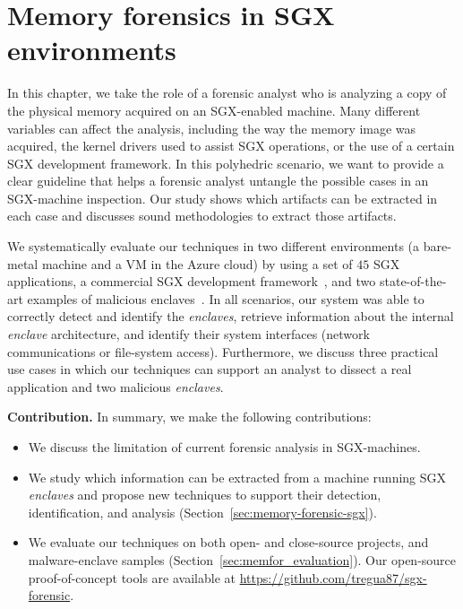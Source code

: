 \chapter{Memory forensics in SGX environments}
\label{chp:forensic}


In this chapter, we take the role of a forensic analyst who is analyzing a copy 
of the physical memory acquired on an SGX-enabled machine. 
Many different variables can affect the analysis, including the way the memory 
image was acquired, the kernel drivers used to assist SGX operations, or the 
use of a certain SGX development framework. In this polyhedric scenario, we 
want to provide a clear guideline that helps a forensic analyst untangle the 
possible cases in an SGX-machine inspection. Our study shows which artifacts 
can be extracted in each case and discusses sound methodologies to extract those
artifacts.

We systematically evaluate our techniques in two different environments (a 
bare-metal machine and a VM in the Azure cloud) by using a set of $45$ SGX 
applications, a commercial SGX development framework~\citep{conclave}, and two 
state-of-the-art examples of malicious enclaves~\citep{sgxrop,snakegx}.
In all scenarios, our system was able to correctly detect and identify the
\emph{enclaves}, retrieve information about the
internal \emph{enclave} architecture, and identify their system interfaces
(\eg network communications or file-system access).
Furthermore, we discuss three practical use cases in which our techniques
can support an analyst to dissect a real application and two malicious 
\emph{enclaves}.

\vspace{0.2cm}
\noindent \textbf{Contribution.} In summary, we make the following 
contributions:
\begin{itemize}
	\item We discuss the limitation of current forensic analysis in 
	SGX-machines.
	\item We study which information can be extracted from a machine running 
	SGX \emph{enclaves} and propose new techniques to support their detection, 
	identification, and analysis (Section~\ref{sec:memory-forensic-sgx}).
	\item We evaluate our techniques on both open- and close-source projects, 
	and malware-enclave samples (Section~\ref{sec:memfor_evaluation}).
	Our open-source proof-of-concept tools are available 
	at \url{https://github.com/tregua87/sgx-forensic}.
\end{itemize}

